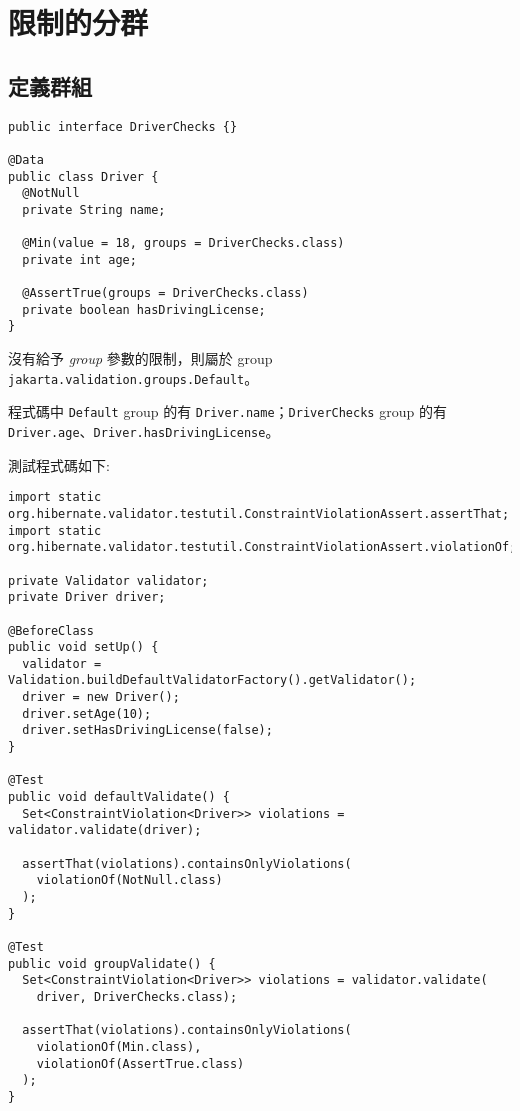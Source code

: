 \chapter{限制的分群}

\section{定義群組}

\begin{lstlisting}
public interface DriverChecks {}

@Data
public class Driver {
  @NotNull
  private String name;

  @Min(value = 18, groups = DriverChecks.class)
  private int age;

  @AssertTrue(groups = DriverChecks.class)
  private boolean hasDrivingLicense;
}
\end{lstlisting}

沒有給予 \textit{group} 參數的限制，則屬於 group \texttt{jakarta.validation.groups.Default}。

程式碼中 \texttt{Default} group 的有 \texttt{Driver.name}；\texttt{DriverChecks} group 的有 \texttt{Driver.age}、\texttt{Driver.hasDriving{\break}License}。

測試程式碼如下:

\begin{lstlisting}
import static org.hibernate.validator.testutil.ConstraintViolationAssert.assertThat;
import static org.hibernate.validator.testutil.ConstraintViolationAssert.violationOf;

private Validator validator;
private Driver driver;

@BeforeClass
public void setUp() {
  validator = Validation.buildDefaultValidatorFactory().getValidator();
  driver = new Driver();
  driver.setAge(10);
  driver.setHasDrivingLicense(false);
}

@Test
public void defaultValidate() {
  Set<ConstraintViolation<Driver>> violations = validator.validate(driver);

  assertThat(violations).containsOnlyViolations(
    violationOf(NotNull.class)
  );
}

@Test
public void groupValidate() {
  Set<ConstraintViolation<Driver>> violations = validator.validate(
    driver, DriverChecks.class);

  assertThat(violations).containsOnlyViolations(
    violationOf(Min.class),
    violationOf(AssertTrue.class)
  );
}
\end{lstlisting}

